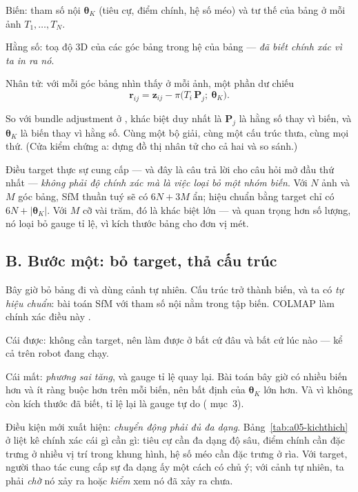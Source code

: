 \documentclass[../../vslam.tex]{subfiles}
\begin{document}
Biến: tham số nội \(\boldsymbol{\theta}_K\) (tiêu cự, điểm chính, hệ số méo) và tư thế của bảng ở mỗi ảnh \(T_1,\dots,T_N\).

Hằng số: toạ độ \(3\)D của các góc bảng trong hệ của bảng --- \emph{đã biết chính xác vì ta in ra nó}.

Nhân tử: với mỗi góc bảng nhìn thấy ở mỗi ảnh, một phần dư chiếu
\[
\mathbf{r}_{ij} = \mathbf{z}_{ij} - \pi\bigl(T_i\,\mathbf{P}_j;\ \boldsymbol{\theta}_K\bigr).
\]

So với bundle adjustment ở , khác biệt duy nhất là \(\mathbf{P}_j\) là hằng số thay vì biến, và \(\boldsymbol{\theta}_K\) là biến thay vì hằng số. Cùng một bộ giải, cùng một cấu trúc thưa, cùng mọi thứ. (Cửa kiểm chứng a: dựng đồ thị nhân tử cho cả hai và so sánh.)

Điều target thực sự cung cấp --- và đây là câu trả lời cho câu hỏi mở đầu thứ nhất --- \emph{không phải độ chính xác mà là việc loại bỏ một nhóm biến}. Với \(N\) ảnh và \(M\) góc bảng, SfM thuần tuý sẽ có \(6N + 3M\) ẩn; hiệu chuẩn bằng target chỉ có \(6N + |\boldsymbol{\theta}_K|\). Với \(M\) cỡ vài trăm, đó là khác biệt lớn --- và quan trọng hơn số lượng, nó loại bỏ gauge tỉ lệ, vì kích thước bảng cho đơn vị mét.

\subsection{B. Bước một: bỏ target, thả cấu trúc}

Bây giờ bỏ bảng đi và dùng cảnh tự nhiên. Cấu trúc trở thành biến, và ta có \emph{tự hiệu chuẩn}: bài toán SfM với tham số nội nằm trong tập biến. COLMAP làm chính xác điều này \cite{schonberger2016colmap}.

Cái được: không cần target, nên làm được ở bất cứ đâu và bất cứ lúc nào --- kể cả trên robot đang chạy.

Cái mất: \emph{phương sai tăng}, và gauge tỉ lệ quay lại. Bài toán bây giờ có nhiều biến hơn và ít ràng buộc hơn trên mỗi biến, nên bất định của \(\boldsymbol{\theta}_K\) lớn hơn. Và vì không còn kích thước đã biết, tỉ lệ lại là gauge tự do ( mục~3).

Điều kiện mới xuất hiện: \emph{chuyển động phải đủ đa dạng}. Bảng~\ref{tab:a05-kichthich} ở  liệt kê chính xác cái gì cần gì: tiêu cự cần đa dạng độ sâu, điểm chính cần đặc trưng ở nhiều vị trí trong khung hình, hệ số méo cần đặc trưng ở rìa. Với target, người thao tác cung cấp sự đa dạng ấy một cách có chủ ý; với cảnh tự nhiên, ta phải \emph{chờ} nó xảy ra hoặc \emph{kiểm} xem nó đã xảy ra chưa.
\end{document}

